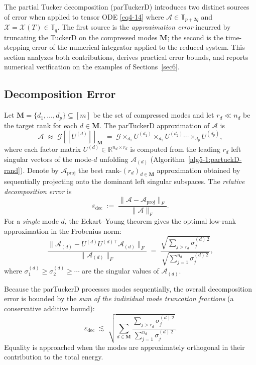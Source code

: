 \documentclass[11pt, oneside]{article}  %
\newcommand{\dsb}[1]{[\![#1]\!]}
\newcommand{\norm}[1]{\parallel\! #1\! \parallel}
\newcommand{\varp}{\varepsilon}
\newcommand{\RR}{\mathbb{R}}
\newcommand{\TT}{\mathbb{T}}
\newcommand{\A}{\mathcal{A}}
\newcommand{\caG}{\mathcal{G}}
\newcommand{\caM}{\mathbf{M}}
\newcommand{\X}{\mathcal{X}}
\newcommand{\beq}{\begin{equation}}
\newcommand{\eeq}{\end{equation}}
\begin{document}
The partial Tucker decomposition (parTuckerD) introduces two distinct sources of error when applied to tensor ODE \eqref{eq4-14} where 
$\A\in\TT_{p+2q}$ and $\X=\X(T)\in\TT_{q}$. The first source is the \emph{approximation error} incurred by truncating the TuckerD on the 
compressed modes $\caM$; the second is the time-stepping error of the numerical integrator applied to the reduced system.  This section analyzes 
both contributions, derives practical error bounds, and reports numerical verification on the examples of Sections~\ref{sec6}. 

\subsection{Decomposition Error}
\label{sec7-1:decomp}

Let $\caM=\{d_1,\dots,d_p\}\subseteq[m]$ be the set of compressed modes and let $r_d\ll n_d$ be the target rank for each $d\in\caM$. The 
parTuckerD approximation of $\A$ is
\beq\label{eq:ptuck-approx}
\A \;\approx\; \caG \dsb{U^{(d)}}_{\caM}\;=\; \caG \times_{d_1} U^{(d_1)} \times_{d_2} U^{(d_2)}\cdots \times_{d_p} U^{(d_p)},
\eeq
where each factor matrix $U^{(d)}\in\RR^{n_d\times r_d}$ is computed from the leading $r_d$ left singular vectors of the mode-$d$ unfolding
$\A_{(d)}$ (Algorithm~\ref{alg5-1:partuckD-rand}).  Denote by $\A_{\text{proj}}$ the best rank-$(r_d)_{d\in\caM}$ approximation obtained by 
sequentially projecting onto the dominant left singular subspaces.  The \emph{relative decomposition error} is 
\beq\label{eq:decomp-err-def}
\varp_{\text{dec}}\;:=\;\frac{\norm{\A-\A_{\text{proj}}}_F}{\norm{\A}_F}.
\eeq
For a \emph{single} mode $d$, the Eckart--Young theorem gives the optimal low-rank approximation in the Frobenius norm:
\beq\label{eq:single-mode-bound}
\frac{\norm{\A_{(d)} - U^{(d)} U^{(d)\top}\A_{(d)}}_F}{\norm{\A_{(d)}}_F}\;=\;
\frac{\sqrt{\sum_{j>r_d}\sigma_j^{(d)\,2}}}{\sqrt{\sum_{j=1}^{n_d}\sigma_j^{(d)\,2}}},
\eeq
where $\sigma_1^{(d)}\ge\sigma_2^{(d)}\ge\cdots$ are the singular values of $\A_{(d)}$.

Because the parTuckerD processes modes sequentially, the overall decomposition error is bounded by the \emph{sum of the individual mode
truncation fractions} (a conservative additive bound):
\beq\label{eq:decomp-bound}
\varp_{\text{dec}}\;\lesssim\;\sqrt{\sum_{d\in\caM}\frac{\sum_{j>r_d}\sigma_j^{(d)\,2}}{\sum_{j=1}^{n_d}\sigma_j^{(d)\,2}} }.
\eeq
Equality is approached when the modes are approximately orthogonal in their contribution to the total energy.
\end{document}
